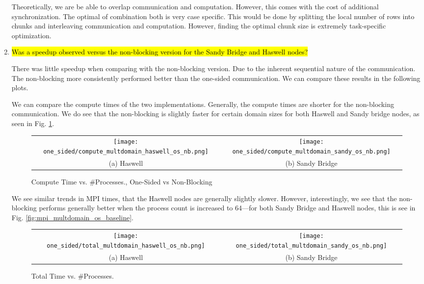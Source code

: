 \begin{enumerate}
	Theoretically, we are be able to overlap communication and computation. However, this comes with the cost of additional synchronization. The optimal of combination both is very case specific. This would be done by splitting the local number of rows into chunks and interleaving communication and computation. However, finding the optimal chunk size is extremely task-specific optimization.

  \item \hl{Was a speedup observed versus the non-blocking version for the Sandy Bridge and Haswell nodes?}

	There was little speedup when comparing with the non-blocking version. Due to the inherent sequential nature of the communication. The non-blocking more consistently performed better than the one-sided communication. We can compare these results in the following plots.
	
	We can compare the compute times of the two implementations. Generally, the compute times are shorter for the non-blocking communication. 
	We do see that the non-blocking is slightly faster for certain domain sizes for both Haswell and Sandy bridge nodes, as seen in Fig. \ref{fig:compute_multdomain_os_nb}.
	    	\begin{figure}[h] %
		\hspace*{-0.25\linewidth}\begin{tabular}{cc}
			\texttt{[image: one\_sided/compute\_multdomain\_haswell\_os\_nb.png]} & \texttt{[image: one\_sided/compute\_multdomain\_sandy\_os\_nb.png]} \\
			(a) Haswell &  (b) Sandy Bridge\\[6pt]
		\end{tabular}
		\caption{Compute Time vs. \#Processes., One-Sided vs Non-Blocking}
		\label{fig:compute_multdomain_os_nb}
	\end{figure}
	
	We see similar trends in MPI times, that the Haswell nodes are generally slightly slower. 
	However, interestingly, we see that the non-blocking performs generally better when the process count is increased to 64---for both Sandy Bridge and Haswell nodes, this is see in Fig. \ref{fig:mpi_multdomain_os_baseline}.
			\begin{figure}[h] %
		\hspace*{-0.25\linewidth}\begin{tabular}{cc}
			\texttt{[image: one\_sided/total\_multdomain\_haswell\_os\_nb.png]} & \texttt{[image: one\_sided/total\_multdomain\_sandy\_os\_nb.png]} \\
			(a) Haswell &  (b) Sandy Bridge\\[6pt]
		\end{tabular}
		\caption{Total Time vs. \#Processes.}
		\label{fig:total_multdomain_os_nb}
	\end{figure}
	

\end{enumerate}
